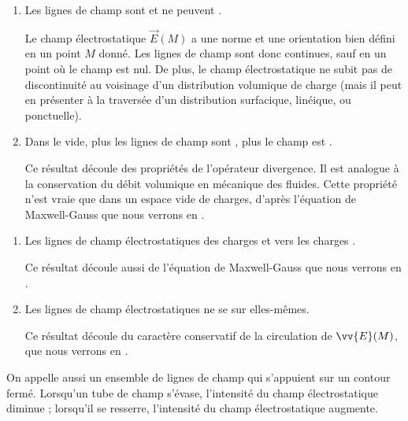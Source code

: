 \documentclass[12pt,fancy]{cours}
\begin{document}
\noindent{}
\medskip
\begin{enumerate}
  \item Les lignes de champ sont  et ne peuvent .
  
  \begin{preuve}
    Le champ électrostatique $\Vec{E}(M)$ a une norme et une orientation bien défini en un point $M$ donné. Les lignes de champ sont donc continues, sauf en un point où le champ est nul. De plus, le champ électrostatique ne subit pas de discontinuité au voisinage d'un distribution volumique de charge (mais il peut en présenter à la traversée d'un distribution surfacique, linéique, ou ponctuelle).
  \end{preuve}

  \item Dans le vide, plus les lignes de champ sont , plus le champ est .
  
  \begin{preuve}
    Ce résultat découle des propriétés de l'opérateur divergence. Il est analogue à la conservation du débit volumique en mécanique des fluides. Cette propriété n'est vraie que dans un espace vide de charges, d'après l'équation de Maxwell-Gauss que nous verrons en .
  \end{preuve}
\end{enumerate}

\noindent{}
\medskip
\setcounter{enumi}{2}
\begin{enumerate}
  \item Les lignes de champ électrostatiques  des charges \encircle{$+$} et  vers les charges \encircle{$-$}.
   \begin{preuve}
    Ce résultat découle aussi de l'équation de Maxwell-Gauss que nous verrons en .
  \end{preuve}

  \item Les lignes de champ électrostatiques  ne se  sur elles-mêmes.
  
  \begin{preuve}
    Ce résultat découle du caractère conservatif de la circulation de $\vv{E}(M)$, que nous verrons en .
  \end{preuve}
\end{enumerate}
On appelle aussi  un ensemble de lignes de champ qui s'appuient sur un contour fermé. Lorsqu’un tube de champ s’évase, l’intensité du champ électrostatique diminue ; lorsqu’il se resserre, l’intensité du champ électrostatique augmente.
\end{document}

